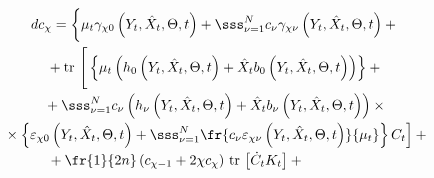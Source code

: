 \begin{multline*}

d c_\chi =\left\{

\vphantom{\left( 

b_0 \left(Y_t,\hat X_t,\Theta,t\right) +\sss_{\nu=1}^N \fr{c_\nu

    b_\nu \left(Y_t,\hat X_t,\Theta,t\right)^{\mathrm{T}} }{\mu_t}\right)}

    \mu_t\gamma_{\chi 0} \left(Y_t,\hat X_t,\Theta,t\right) + \sss_{\nu=1}^N

    c_\nu \gamma_{\chi\nu} \left(Y_t,\hat X_t,\Theta,t\right)+{}\right.\\[-1pt]

{}+\mathrm{tr}\,\left[ 

\vphantom{\fr{c_\nu \varepsilon_{\chi\nu} \left(Y_t,\hat X_t,\Theta,t\right)}{\mu_t}}

\vphantom{\sum\limits_{v=1}^N}

\left\{ \mu_t\left( h_0 \left(Y_t,\hat X_t,\Theta,t\right)+

\hat X_t b_0 \left(Y_t,\hat  X_t,\Theta,t\right)\right)\right\}+{}\right.\\[-1pt]

{}+\sss_{\nu=1}^N c_\nu \left(h_\nu \left(Y_t,\hat X_t,\Theta,t\right) +\hat X_t

    b_\nu \left(Y_t,\hat X_t,\Theta,t\right)\right)\times{}\\[-1pt]

\left.{}\times \left\{ \varepsilon_{\chi 0}

    \left(Y_t,\hat X_t,\Theta,t\right) +\sss_{\nu=1}^N

    \fr{c_\nu \varepsilon_{\chi\nu} \left(Y_t,\hat X_t,\Theta,t\right)}{\mu_t}\right\} C_t

    \right]+{}\\[-1pt]

    {}+ \fr{1}{2n}\left(c_{\chi-1} +2\chi c_\chi\right)\,\mathrm{tr}\, \left[ \dot 

C_t     K_t\right]+{}\hspace*{20mm}

\end{multline*}



\noindent

